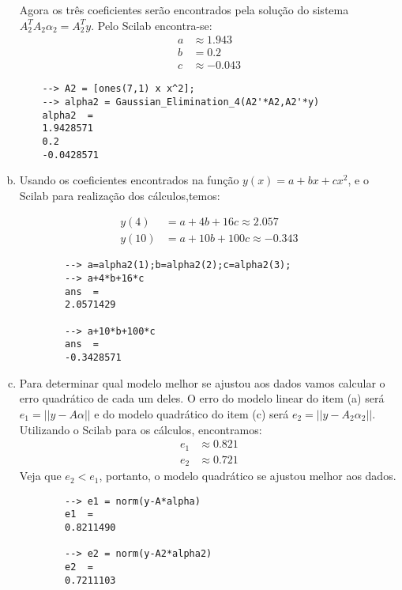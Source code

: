 \documentclass[12pt]{article}
\begin{document}
\begin{enumerate}[a)]
	Agora os três coeficientes serão encontrados pela solução do sistema $A_2^TA_2\alpha_2=A_2^Ty$. Pelo Scilab encontra-se:
	\begin{align*}
		a&\approx1.943\\
		b&=0.2\\
		c&\approx-0.043
	\end{align*}
	\begin{lstlisting}
	--> A2 = [ones(7,1) x x^2];
	--> alpha2 = Gaussian_Elimination_4(A2'*A2,A2'*y)
	alpha2  = 
	1.9428571
	0.2      
	-0.0428571
	\end{lstlisting}

	\item Usando os coeficientes encontrados na função $y(x)=a+bx+cx^2$, e o Scilab para realização dos cálculos,temos:
	
	\begin{align*}
		y(4) &= a+4b+16c \approx 2.057\\
		y(10) & = a+10b+100c \approx -0.343
	\end{align*}
	
	\begin{lstlisting}
		--> a=alpha2(1);b=alpha2(2);c=alpha2(3);
		--> a+4*b+16*c
		ans  =
		2.0571429
		
		--> a+10*b+100*c
		ans  =
		-0.3428571
	\end{lstlisting}

	\item Para determinar qual modelo melhor se ajustou aos dados vamos calcular o erro quadrático de cada um deles. O erro do modelo linear do item (a) será $e_1=||y-A\alpha||$ e do modelo quadrático do item (c) será $e_2=||y-A_2\alpha_2||$. Utilizando o Scilab para os cálculos, encontramos:
	\begin{align*}
		e_1&\approx 0.821\\
		e_2&\approx 0.721
	\end{align*}
	Veja que $e_2<e_1$, portanto, o modelo quadrático se ajustou melhor aos dados.
	\begin{lstlisting}
		--> e1 = norm(y-A*alpha)
		e1  = 
		0.8211490
		
		--> e2 = norm(y-A2*alpha2)
		e2  = 
		0.7211103
	\end{lstlisting}
\end{enumerate}
\end{document}
